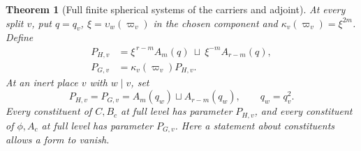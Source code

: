 \documentclass[a4paper,11pt]{article}
\newtheorem{theorem}[proposition]{Theorem}
\theoremstyle{definition}
\theoremstyle{remark}
\numberwithin{equation}{section}
\begin{document}
\begin{theorem}[Full finite spherical systems of the carriers and adjoint]
\leavevmode\label{thm:allcarriers830}
At every split \(v\), put \(q=q_v\),
\(\xi=\upsilon_w(\varpi_v)\) in the chosen component and
\(\kappa_v(\varpi_v)=\xi^{2m}\). Define
\[
 \begin{split}
 P_{H,v}&=\xi^{\,r-m}A_m(q)\ \sqcup\ \xi^{-m}A_{r-m}(q),\\
 P_{G,v}&=\kappa_v(\varpi_v)P_{H,v}.
 \end{split}
\]
At an inert place \(v\) with \(w\mid v\), set
\[
          P_{H,v}=P_{G,v}=A_m(q_w)\sqcup A_{r-m}(q_w),
                       \qquad q_w=q_v^2 .
\]
Every constituent of \(C,B_c\) at full level has parameter
\(P_{H,v}\), and every constituent of \(\phi,A_c\) at full
level has parameter \(P_{G,v}\). Here a statement about
constituents allows a form to vanish.
\end{theorem}
\end{document}

